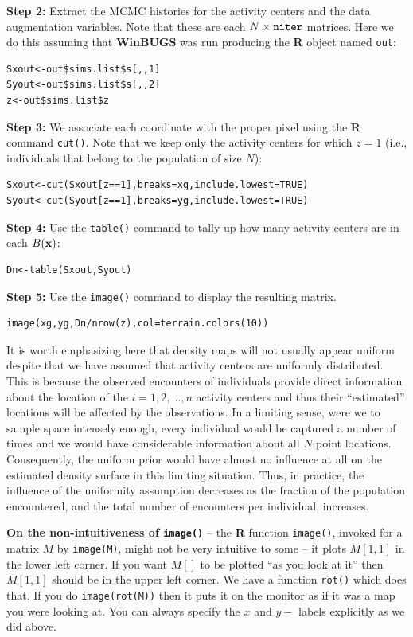 {\flushleft \bf Step 2:} Extract the MCMC histories for the activity
centers and the data augmentation variables.  Note that these are each
$N \times \mbox{\tt niter}$ matrices. Here we do this assuming that
{\bf WinBUGS} was run producing the {\bf R} object named \mbox{\tt out}:
\begin{verbatim}
Sxout<-out$sims.list$s[,,1]
Syout<-out$sims.list$s[,,2]
z<-out$sims.list$z
\end{verbatim}

{\flushleft \bf Step 3:} We associate each coordinate with the proper
pixel using the {\bf R} command \mbox{\tt cut()}. Note that we keep only
the activity centers for which $z=1$ (i.e., individuals that belong to
the population of size $N$):
\begin{verbatim}
Sxout<-cut(Sxout[z==1],breaks=xg,include.lowest=TRUE)
Syout<-cut(Syout[z==1],breaks=yg,include.lowest=TRUE)
\end{verbatim}

{\flushleft \bf Step 4:} Use the \mbox{\tt table()} command to tally
up how many activity centers are in each $B({\bf x})$:
\begin{verbatim}
Dn<-table(Sxout,Syout)
\end{verbatim}

{\flushleft \bf Step 5:} Use the \mbox{\tt image()} command to display
the resulting matrix.
\begin{verbatim}
image(xg,yg,Dn/nrow(z),col=terrain.colors(10))
\end{verbatim}

It is worth emphasizing here that density maps will not usually appear
uniform despite that we have assumed that activity centers are
uniformly distributed. This is because the observed encounters of
individuals provide direct information about the location of the
$i=1,2,\ldots,n$ activity centers and thus their ``estimated''
locations will be affected by the observations. In a limiting sense,
were we to sample space intensely enough, every individual would be
captured a number of times and we would have considerable information
about all $N$ point locations. Consequently, the uniform prior would
have almost no influence at all on the estimated density surface in
this limiting situation. Thus, in practice, the influence of the
uniformity assumption decreases as the fraction of the population
encountered, and the total number of encounters per individual, increases.

{\bf On the non-intuitiveness of \mbox{\tt image()} } -- the {\bf R}
function \mbox{\tt image()}, invoked for a matrix $M$ by \mbox{\tt image(M)}, might
not be very intuitive to some -- it plots $M[1,1]$ in the lower left
corner. If you want $M[]$ to be plotted ``as
you look at it'' then $M[1,1]$ should be in the upper left corner.  We
have a function \mbox{\tt rot()} which does that. If you do \mbox{\tt image(rot(M))} then it
puts it on the monitor as if it was a map you were looking at.  You
can always specify the $x$ and $y-$ labels explicitly as we did above.

